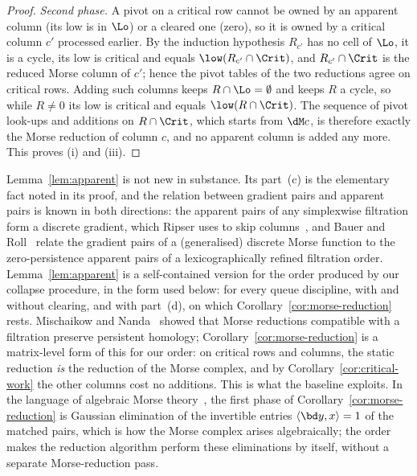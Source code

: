\begin{proof}
\emph{Second phase.} A pivot on a critical row cannot be owned by an apparent
column (its low is in $\Lo$) or a cleared one (zero), so it is owned by a
critical column $c'$ processed earlier. By the induction hypothesis $R_{c'}$ has
no cell of $\Lo$, it is a cycle, its low is critical and equals
$\low(R_{c'}\cap\Crit)$, and $R_{c'}\cap\Crit$ is the reduced Morse column of
$c'$; hence the pivot tables of the two reductions agree on critical rows.
Adding such columns keeps $R\cap\Lo=\emptyset$ and keeps $R$ a cycle, so while
$R\ne0$ its low is critical and equals $\low(R\cap\Crit)$. The sequence of pivot
look-ups and additions on $R\cap\Crit$, which starts from $\dM c$, is therefore
exactly the Morse reduction of column $c$, and no apparent column is added any
more. This proves (i) and (iii).
\end{proof}

\begin{remark}\label{rem:morse-literature}
Lemma~\ref{lem:apparent} is not new in substance. Its part~(c) is the
elementary fact noted in its proof, and the relation between gradient pairs and
apparent pairs is known in both directions: the apparent pairs of any
simplexwise filtration form a discrete gradient, which Ripser uses to skip
columns~\cite{bauer2021ripser}, and Bauer and Roll~\cite{bauer2024wrapping}
relate the gradient pairs of a (generalised) discrete Morse function to the
zero-persistence apparent pairs of a lexicographically refined filtration
order. Lemma~\ref{lem:apparent} is a self-contained version for the order
produced by our collapse procedure, in the form used below: for every queue
discipline, with and without clearing, and with part~(d), on which
Corollary~\ref{cor:morse-reduction} rests. Mischaikow and Nanda~\cite{mischaikow2013morse} showed that
Morse reductions compatible with a filtration preserve persistent homology;
Corollary~\ref{cor:morse-reduction} is a matrix-level form of this for our order:
on critical rows and columns, the static reduction \emph{is} the reduction of
the Morse complex, and by Corollary~\ref{cor:critical-work} the other columns
cost no additions. This is what the  baseline exploits. In the
language of algebraic Morse theory~\cite{skoldberg2006morse,jollenbeck2009minimal},
the first phase of
Corollary~\ref{cor:morse-reduction} is Gaussian elimination of the invertible
entries $\langle\bd y,x\rangle=1$ of the matched pairs, which is how the Morse
complex arises algebraically; the order makes the reduction algorithm perform
these eliminations by itself, without a separate Morse-reduction pass.
\end{remark}

